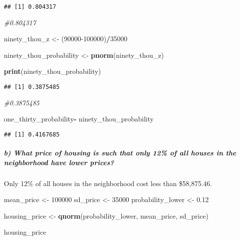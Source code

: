 \documentclass[
]{article}
\newenvironment{Shaded}{\begin{snugshade}}{\end{snugshade}}
\newcommand{\CommentTok}[1]{\textcolor[rgb]{0.56,0.35,0.01}{\textit{#1}}}
\newcommand{\DecValTok}[1]{\textcolor[rgb]{0.00,0.00,0.81}{#1}}
\newcommand{\FloatTok}[1]{\textcolor[rgb]{0.00,0.00,0.81}{#1}}
\newcommand{\FunctionTok}[1]{\textcolor[rgb]{0.13,0.29,0.53}{\textbf{#1}}}
\newcommand{\NormalTok}[1]{#1}
\newcommand{\OtherTok}[1]{\textcolor[rgb]{0.56,0.35,0.01}{#1}}
\newcommand{\SpecialCharTok}[1]{\textcolor[rgb]{0.81,0.36,0.00}{\textbf{#1}}}
\begin{document}
\begin{verbatim}
## [1] 0.804317
\end{verbatim}

\begin{Shaded}
\begin{Highlighting}[]
\CommentTok{\#0.804317}

\NormalTok{ninety\_thou\_z }\OtherTok{\textless{}{-}}\NormalTok{ (}\DecValTok{90000{-}100000}\NormalTok{)}\SpecialCharTok{/}\DecValTok{35000}

\NormalTok{ninety\_thou\_probability }\OtherTok{\textless{}{-}} \FunctionTok{pnorm}\NormalTok{(ninety\_thou\_z)}

\FunctionTok{print}\NormalTok{(ninety\_thou\_probability)}
\end{Highlighting}
\end{Shaded}

\begin{verbatim}
## [1] 0.3875485
\end{verbatim}

\begin{Shaded}
\begin{Highlighting}[]
\CommentTok{\#0.3875485}

\NormalTok{one\_thirty\_probability}\SpecialCharTok{{-}}\NormalTok{ ninety\_thou\_probability}
\end{Highlighting}
\end{Shaded}

\begin{verbatim}
## [1] 0.4167685
\end{verbatim}

\hypertarget{b-what-price-of-housing-is-such-that-only-12-of-all-houses-in-the-neighborhood-have-lower-prices}{%
\subparagraph{b) What price of housing is such that only 12\% of all
houses in the neighborhood have lower
prices?}\label{b-what-price-of-housing-is-such-that-only-12-of-all-houses-in-the-neighborhood-have-lower-prices}}

Only 12\% of all houses in the neighborhood cost less than \$58,875.46.

\begin{Shaded}
\begin{Highlighting}[]
\NormalTok{mean\_price }\OtherTok{\textless{}{-}} \DecValTok{100000}
\NormalTok{sd\_price }\OtherTok{\textless{}{-}} \DecValTok{35000}
\NormalTok{probability\_lower }\OtherTok{\textless{}{-}} \FloatTok{0.12}

\NormalTok{housing\_price }\OtherTok{\textless{}{-}} \FunctionTok{qnorm}\NormalTok{(probability\_lower, mean\_price, sd\_price)}

\NormalTok{housing\_price}
\end{Highlighting}
\end{Shaded}
\end{document}
